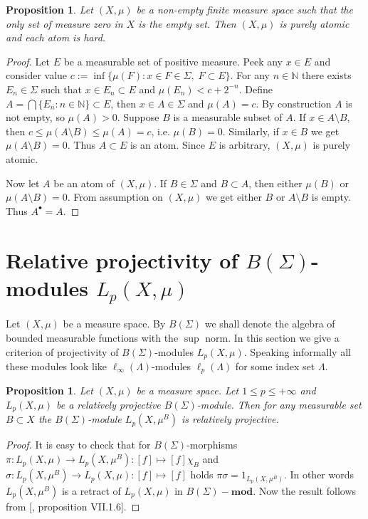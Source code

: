 \documentclass[12pt]{article}
\newtheorem{proposition}[theorem]{Proposition}
\begin{document}
\begin{proposition}\label{GenniunelyAtomicMeasCharac} Let $(X,\mu)$ be a non-empty finite measure space such that the only set of measure zero in $X$ is the empty set. Then $(X,\mu)$ is purely atomic and each atom is hard.
\end{proposition}
\begin{proof} Let $E$ be a measurable set of positive measure. Peek any $x\in E$ and consider value $c:=\inf\{\mu(F):x\in F\in \Sigma,\; F\subset E\}$. For any $n\in\mathbb{N}$ there exists $E_n\in\Sigma$ such that $x\in E_n\subset E$ and $\mu(E_n)<c+2^{-n}$. Define $A=\bigcap\{E_n:n\in\mathbb{N}\}\subset E$, then $x\in A\in\Sigma$ and $\mu(A)=c$. By construction $A$ is not empty, so $\mu(A)>0$. Suppose $B$ is a measurable subset of $A$. If $x\in A\setminus B$, then $c
        \leq\mu(A\setminus B)\leq\mu(A)=c$, i.e. $\mu(B)=0$. Similarly, if $x\in B$ we get $\mu(A\setminus B)=0$. Thus $A\subset E$ is an atom. Since $E$ is arbitrary, $(X,\mu)$ is purely atomic.

    Now let $A$ be an atom of $(X,\mu)$. If $B\in\Sigma$ and $B\subset A$, then either $\mu(B)$ or $\mu(A\setminus B)=0$. From assumption on $(X,\mu)$ we get either $B$ or $A\setminus B$ is empty. Thus $A^\bullet=A$.
\end{proof}


\section{Relative projectivity of \texorpdfstring{$B(\Sigma)$}{BSigma}-modules \texorpdfstring{$L_p(X,\mu)$}{LpXmu}}
\label{SectionRelativeProjectivityOfBSigmaModulesLpXmu}

Let $(X,\mu)$ be a measure space. By $B(\Sigma)$ we shall denote the algebra of bounded measurable functions with the  $\sup$ norm. In this section we give a criterion of projectivity of $B(\Sigma)$-modules $L_p(X,\mu)$. Speaking informally all these modules look like $\ell_\infty(\Lambda)$-modules $\ell_p(\Lambda)$ for some index set $\Lambda$.

\begin{proposition}\label{BSigmaModLpRetrProj} Let $(X,\mu)$ be a measure space. Let $1\leq p\leq +\infty$ and $L_p(X,\mu)$ be a relatively projective $B(\Sigma)$-module. Then for any measurable set $B\subset X$ the $B(\Sigma)$-module $L_p(X,\mu^B)$ is relatively projective.
\end{proposition}
\begin{proof} It is easy to check that for $B(\Sigma)$-morphisms $\pi:L_p(X,\mu)\to L_p(X,\mu^B):[f]\mapsto [f]\chi_B$ and $\sigma:L_p(X,\mu^B)\to L_p(X,\mu):[f]\mapsto [f]$ holds $\pi\sigma=1_{L_p(X,\mu^B)}$. In other words $L_p(X,\mu^B)$ is a retract of $L_p(X,\mu)$ in $B(\Sigma)-\mathbf{mod}$. Now the result follows from [\cite{HelBanLocConvAlg}, proposition VII.1.6].
\end{proof}
\end{document}
